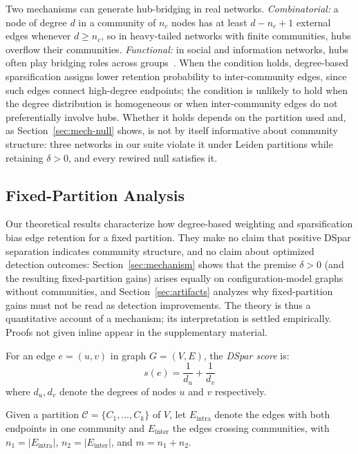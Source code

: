 Two mechanisms can generate hub-bridging in real networks.
\textit{Combinatorial:} a node of degree $d$ in a community of $n_c$ nodes has at least $d - n_c + 1$ external edges whenever $d \ge n_c$, so in heavy-tailed networks with finite communities, hubs overflow their communities.
\textit{Functional:} in social and information networks, hubs often play bridging roles across groups~\cite{granovetter1973strength,newman2001structure}.
When the condition holds, degree-based sparsification assigns lower retention probability to inter-community edges, since such edges connect high-degree endpoints; the condition is unlikely to hold when the degree distribution is homogeneous or when inter-community edges do not preferentially involve hubs.
Whether it holds depends on the partition used and, as Section~\ref{sec:mech-null} shows, is not by itself informative about community structure: three networks in our suite violate it under Leiden partitions while retaining $\delta > 0$, and every rewired null satisfies it.

\subsection{Fixed-Partition Analysis}

Our theoretical results characterize how degree-based weighting and sparsification bias edge retention for a fixed partition. They make no claim that positive DSpar separation indicates community structure, and no claim about optimized detection outcomes: Section~\ref{sec:mechanism} shows that the premise $\delta>0$ (and the resulting fixed-partition gains) arises equally on configuration-model graphs without communities, and Section~\ref{sec:artifacts} analyzes why fixed-partition gains must not be read as detection improvements. The theory is thus a quantitative account of a mechanism; its interpretation is settled empirically.
Proofs not given inline appear in the supplementary material.

\begin{definition}
For an edge $e = (u,v)$ in graph $G = (V, E)$, the \emph{DSpar score} is:
\begin{equation}
s(e) = \frac{1}{d_u} + \frac{1}{d_v}
\end{equation}
where $d_u, d_v$ denote the degrees of nodes $u$ and $v$ respectively.
\end{definition}

\begin{definition}
Given a partition $\mathcal{C} = \{C_1, \ldots, C_k\}$ of $V$, let $E_{\text{intra}}$ denote the edges with both endpoints in one community and $E_{\text{inter}}$ the edges crossing communities, with $n_1 = |E_{\text{intra}}|$, $n_2 = |E_{\text{inter}}|$, and $m = n_1 + n_2$.
\end{definition}

